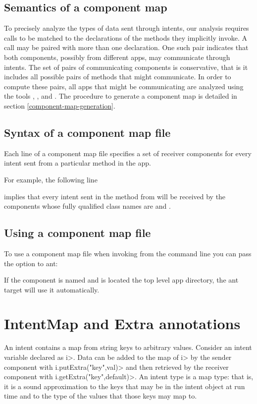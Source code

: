 \subsection{Semantics of a component map}
To precisely analyze the types of data sent through intents, our
analysis requires \sendIntent{} calls to be matched to the declarations of the
\onReceive{} methods they implicitly invoke. A \sendIntent{} call may be paired
with more than one \onReceive{} declaration. One such pair indicates that
both components, possibly from different apps, may communicate through
intents. The set of pairs of communicating components is
conservative, that is it includes all possible pairs of methods that might
communicate. In order to compute these pairs, all apps that might be
communicating are analyzed using the tools , , and
. The procedure to generate a component map is detailed in section
\ref{component-map-generation}.


\subsection{Syntax of a component map file}
Each line of a component map file specifies a set of receiver components for 
every intent sent from a particular method in the app.

For example, the following line


implies that every intent sent in the method  from 
 will be received by the components whose fully qualified class 
names are  and .

\subsection{Using a component map file}
To use a component map file when invoking \theIntentChecker{} from the command
line you can pass the option to ant:


If the component is named  and is located the top level app
directory, the ant target will use it automatically.

\section{IntentMap and Extra annotations}
An intent contains a map from string keys to arbitrary values. Consider an
intent variable declared as \<i>. Data can be added to the map of \<i> by
the sender component with \<i.putExtra("key",val)> and then retrieved by the
receiver component with \<i.getExtra("key",default)>. 
An intent type is a map type: that is, it is a sound approximation to the keys
that may be in the intent object at run time and to the type of the values that
those keys may map to.

